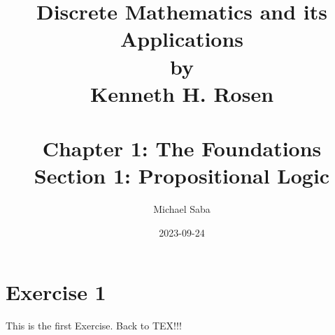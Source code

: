 \documentclass{article}
\title{%
    \Huge Discrete Mathematics and its Applications \\
    \large by \\
    \Large Kenneth H. Rosen \\~\\
    \huge Chapter 1: The Foundations \\
    \LARGE Section 1: Propositional Logic \\
}
\date{2023-09-24}
\author{Michael Saba}
\begin{document}
    \maketitle
    \newpage


    \section*{Exercise 1}
    This is the first Exercise. Back to TEX!!!
\end{document}
